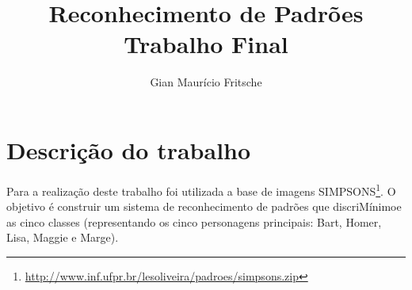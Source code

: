 \documentclass[journal]{IEEEtran}
\begin{document}
\title{Reconhecimento de Padrões\\ Trabalho Final}

\author{Gian Maurício Fritsche}

\maketitle

\IEEEpeerreviewmaketitle

\section{Descrição do trabalho}

Para a realização deste trabalho foi utilizada a base de imagens SIMPSONS\footnote{\url{http://www.inf.ufpr.br/lesoliveira/padroes/simpsons.zip}}.
O objetivo é construir um sistema de reconhecimento de padrões que discriMínimoe as cinco classes (representando os cinco personagens principais: Bart, Homer, Lisa, Maggie e Marge).
\end{document}
